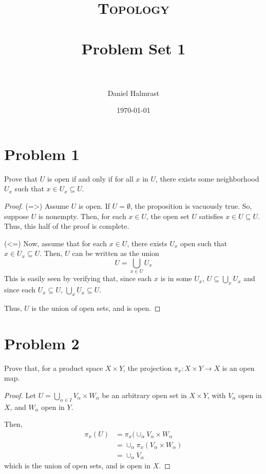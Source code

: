 \documentclass[fontsize=11pt]{scrartcl} %
\title{	
\normalfont \normalsize 
\textsc{Topology} \\ [25pt] %
\horrule{0.5pt} \\[0.4cm] %
\huge Problem Set 1 \\ %
\horrule{2pt} \\[0.5cm] %
}
\author{Daniel Halmrast} %
\date{\normalsize\today} %
\numberwithin{equation}{section} %
\numberwithin{figure}{section} %
\numberwithin{table}{section} %
\begin{document}
\maketitle %

\section*{Problem 1}
Prove that $U$ is open if and only if for all $x$ in $U$, there exists some neighborhood
$U_x$ such that $x\in U_x\subseteq U$.
\\
\begin{proof}
(=>)
Assume $U$ is open. If $U=\emptyset$, the proposition is vacuously true. So, suppose $U$ is
nonempty. Then, for each $x\in U$, the open set $U$ satisfies $x\in U\subseteq U$. Thus,
this half of the proof is complete.

(<=)
Now, assume that for each $x\in U$, there exists $U_x$ open such that $x\in U_x\subseteq U$.
Then, $U$ can be written as the union
\[
U = \bigcup_{x\in U} U_x
\]
This is easily seen by verifying that, since each $x$ is in some $U_x$, $U\subseteq \bigcup_x U_x$
and since each $U_x\subseteq U$, $\bigcup_x U_x \subseteq U$.

Thus, $U$ is the union of open sets, and is open.
\end{proof}


\section*{Problem 2}
Prove that, for a product space $X\times Y$, the projection $\pi_x:X\times Y\to X$ is
an open map.
\\
\begin{proof}
Let $U = \bigcup_{\alpha\in I} V_{\alpha}\times W_{\alpha}$ be an arbitrary open set
in $X\times Y$, with $V_{\alpha}$ open in $X$, and $W_{\alpha}$ open in $Y$.

Then, 
\[
\begin{aligned}
\pi_x(U) &= \pi_x(\cup_{\alpha}V_{\alpha}\times W_{\alpha}\\
        &= \cup_{\alpha}\pi_x(V_{\alpha}\times W_{\alpha})\\
        &= \cup_{\alpha}V_{\alpha}
\end{aligned}
\]
which is the union of open sets, and is open in $X$.
\end{proof}
\end{document}

